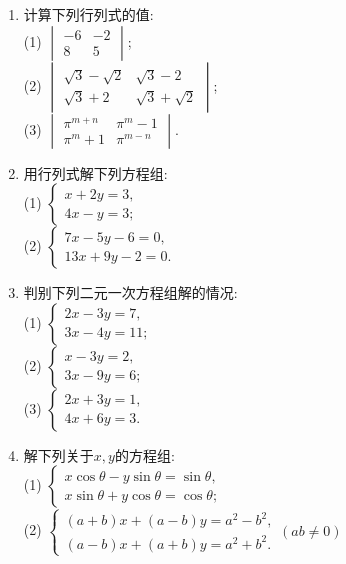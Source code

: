 \documentclass[10pt,a4paper]{article}
\begin{document}
\begin{enumerate}[1.]
\item 计算下列行列式的值:\\
(1) $\begin{vmatrix}    -6 & -2  \\8 & 5  \end{vmatrix}$;\\
(2) $\begin{vmatrix}    \sqrt 3-\sqrt 2 & \sqrt 3-2  \\ \sqrt 3+2 & \sqrt 3+\sqrt 2  \end{vmatrix}$;\\
(3) $\begin{vmatrix}    \pi ^{m+n} & \pi ^m-1  \\\pi ^m+1 & \pi ^{m-n}  \end{vmatrix}$.
\item 用行列式解下列方程组:\\
(1) $\begin{cases}    x+2y=3,  \\4x-y=3;  \end{cases}$\\(2) $\begin{cases}    7x-5y-6=0,  \\13x+9y-2=0.  \end{cases}$
\item 判别下列二元一次方程组解的情况:\\
(1) $\begin{cases}    2x-3y=7,  \\3x-4y=11;  \end{cases}$\\
(2) $\begin{cases}    x-3y=2,  \\3x-9y=6;  \end{cases}$\\
(3) $\begin{cases}    2x+3y=1,  \\4x+6y=3.  \end{cases}$
\item 解下列关于$x,y$的方程组:\\
(1) $\begin{cases}
    x\cos \theta -y\sin \theta =\sin \theta ,  \\x\sin \theta +y\cos \theta =\cos \theta;  \end{cases}$\\
(2) $\begin{cases}
 (a+b)x+(a-b)y=a^2-b^2,  \\(a-b)x+(a+b)y=a^2+b^2.  \end{cases} (ab\ne 0)$

\end{enumerate}
\end{document}
